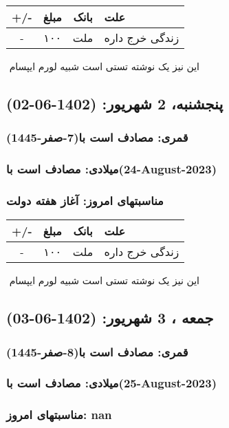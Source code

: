 \documentclass{article}
\newcommand{\rnote}[1]{\marginpar{\textcolor{color}{\StrSubstitute{\##1}{ }{\_}}}}
\newcommand{\myRow}[4]{
    #1 & #2 & #3 & #4 \\ \hline
}
\begin{document}
\begin{tabular}{ | c | c | c | p{5cm} |}
    \hline
    \myRow{ +/- }{مبلغ}{بانک}{علت}
    \myRow{-}{۱۰۰}{ملت}{زندگی خرج داره}
\end{tabular}
\newline
\newline

‌
\rnote{تست}
این نیز یک نوشته تستی است شبیه لورم ایپسام




\newpage
{}
\textcolor{color}{
\section{ پنجشنبه، 2 شهریور: (1402-06-02) }
\subsubsection*{قمری: مصادف است با(7-صفر-1445)} 
\subsubsection*{میلادی: مصادف است با(24-August-2023)}
\subsubsection*{مناسبتهای امروز: آغاز هفته دولت}
}


\begin{tabular}{ | c | c | c | p{5cm} |}
    \hline
    \myRow{ +/- }{مبلغ}{بانک}{علت}
    \myRow{-}{۱۰۰}{ملت}{زندگی خرج داره}
\end{tabular}
\newline
\newline

‌
\rnote{تست}
این نیز یک نوشته تستی است شبیه لورم ایپسام




\newpage
{}
\textcolor{color}{
\section{ جمعه ، 3 شهریور: (1402-06-03) }
\subsubsection*{قمری: مصادف است با(8-صفر-1445)} 
\subsubsection*{میلادی: مصادف است با(25-August-2023)}
\subsubsection*{مناسبتهای امروز: nan}
}
\end{document}
